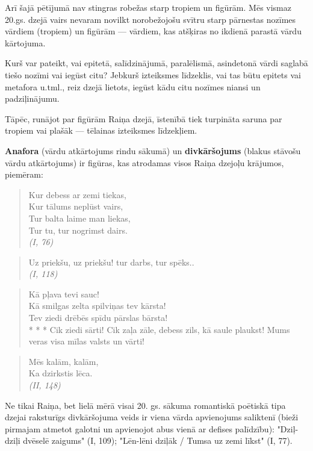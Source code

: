 \documentclass[11pt]{article}
\begin{document}
Arī šajā pētījumā nav stingras robežas starp tropiem un
figūrām. Mēs vismaz 20.gs. dzejā vairs nevaram
novilkt norobežojošu svītru starp pārnestas
nozīmes vārdiem (tropiem) un figūrām ---
vārdiem, kas atšķiras no ikdienā parastā vārdu
kārtojuma.

Kurš var pateikt, vai epitetā, salīdzinājumā,
paralēlismā, asindetonā vārdi saglabā tiešo nozīmi
vai iegūst citu? Jebkurš izteiksmes līdzeklis, vai
tas būtu epitets vai metafora u.tml., reiz
dzejā lietots, iegūst kādu citu nozīmes niansi
un padziļinājumu.

Tāpēc, runājot par figūrām Raiņa dzejā, īstenībā tiek
turpināta saruna par tropiem vai plašāk ---
tēlainas izteiksmes līdzekļiem.

{\bf Anafora} (vārdu atkārtojums rindu sākumā)
un {\bf divkāršojums} (blakus stāvošu vārdu atkārtojums)
ir figūras, kas atrodamas visos Raiņa dzejoļu
krājumos, piemēram:

\begin{quote}
Kur debess ar zemi tiekas,\\
Kur tālums neplūst vairs,\\
Tur balta laime man liekas,\\
Tur tu, tur nogrimst dairs.\\
{\em (I, 76)}
\end{quote}

\begin{quote}
Uz priekšu, uz priekšu! tur darbs, tur spēks..\\
{\em (I, 118)}
\end{quote}

\begin{quote}
Kā pļava tevi sauc!\\
Kā smilgas zelta spilviņas tev kārsta!\\
Tev ziedi drēbēs spīdu pārslas bārsta!\\
* * *
Cik ziedi sārti!
Cik zaļa zāle, debess zils, kā saule plaukst!
Mums veras visa mīlas valsts un vārti!
\end{quote}

\begin{quote}
Mēs kalām, kalām,\\
Ka dzirkstis lēca.\\
{\em (II, 148)}
\end{quote}

Ne tikai Raiņa, bet lielā mērā visai 20. gs.
sākuma romantiskā poētiskā tipa dzejai raksturīgs
divkāršojuma veids ir viena vārda apvienojums
saliktenī (bieži pirmajam atmetot galotni un
apvienojot abus vienā ar defises palīdzību):
"Dziļ-dziļi dvēselē zaigums" (I, 109);
"Lēn-lēni dziļāk / Tumsa uz zemi līkst" (I, 77).
\end{document}

